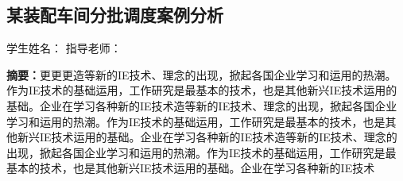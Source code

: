 \begin{Abstract}
\chapter*{某装配车间分批调度案例分析}
\begin{center}
\vspace{2mm}
{

 学生姓名：\extt[2.8em]{\skyauthornamec}\hspace{20mm} 指导老师：\extt[6.4em]{\skymentorc}
}
\end{center}
{\wuhao \songti %
\noindent \textbf{摘要：}更更更造等新的IE技术、理念的出现，掀起各国企业学习和运用的热潮。作为IE技术的基础运用，工作研究是最基本的技术，也是其他新兴IE技术运用的基础。企业在学习各种新的IE技术造等新的IE技术、理念的出现，掀起各国企业学习和运用的热潮。作为IE技术的基础运用，工作研究是最基本的技术，也是其他新兴IE技术运用的基础。企业在学习各种新的IE技术造等新的IE技术、理念的出现，掀起各国企业学习和运用的热潮。作为IE技术的基础运用，工作研究是最基本的技术，也是其他新兴IE技术运用的基础。企业在学习各种新的IE技术

}
\end{Abstract}

